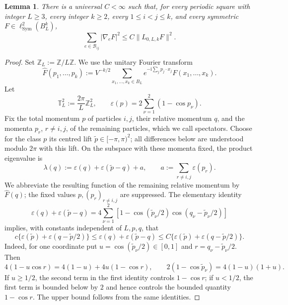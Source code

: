 \documentclass[11pt]{article}
\numberwithin{equation}{section}
\newtheorem{lemma}[theorem]{Lemma}
\theoremstyle{remark}
\newcommand{\1}{\mathbf 1}
\newcommand{\Sym}{\operatorname{Sym}}
\begin{document}
\begin{lemma}
\label{lem:single-diagonal-trace}
There is a universal \(C<\infty\) such that, for every periodic square with
integer \(L\geq3\), every integer \(k\geq2\), every
\(1\leq i<j\leq k\), and every symmetric
\(F\in\ell^2_{\Sym}(B_L^k)\),
\begin{equation}
 \sum_{e\in\mathcal B_{ij}}|\nabla_eF|^2
 \leq C\|L_{0,L,k}F\|^2.
 \label{eq:single-diagonal-trace}
\end{equation}
\end{lemma}

\begin{proof}
Set \(\mathbb Z_L:=\mathbb Z/L\mathbb Z\).  We use the unitary Fourier
transform
\[
 \widehat F(p_1,\ldots,p_k)
 :=V^{-k/2}\sum_{x_1,\ldots,x_k\in B_L}
 e^{-\mathrm i\sum_jp_j\cdot x_j}F(x_1,\ldots,x_k).
\]
Let
\[
 \mathbb T_L^2:=\frac{2\pi}{L}\mathbb Z_L^2,
 \qquad
 \varepsilon(p)=2\sum_{\nu=1}^2(1-\cos p_\nu).
\]
Fix the total momentum \(p\) of particles \(i,j\), their relative momentum
\(q\), and the momenta \(p_r\), \(r\ne i,j\), of the remaining particles,
which we call spectators.  Choose for the
class \(p\) its centred lift \(\widetilde p\in[-\pi,\pi)^2\); all
differences below are understood modulo \(2\pi\) with this lift.  On the
subspace with these momenta fixed, the product eigenvalue is
\begin{equation}
 \lambda(q):=\varepsilon(q)+\varepsilon(\widetilde p-q)+a,
 \qquad a:=\sum_{r\ne i,j}\varepsilon(p_r).
 \label{eq:product-fibre-energy}
\end{equation}
We abbreviate the resulting function of the remaining relative momentum
by \(\widehat F(q)\); the fixed values \(p,(p_r)_{r\ne i,j}\) are
suppressed.
The elementary identity
\[
 \varepsilon(q)+\varepsilon(\widetilde p-q)
 =4\sum_{\nu=1}^2
 \left[1-\cos(\widetilde p_\nu/2)
 \cos(q_\nu-\widetilde p_\nu/2)\right]
\]
implies, with constants independent of \(L,p,q\), that
\begin{equation}
 c\bigl\{\varepsilon(\widetilde p)
       +\varepsilon(q-\widetilde p/2)\bigr\}
 \leq \varepsilon(q)+\varepsilon(\widetilde p-q)
 \leq C\bigl\{\varepsilon(\widetilde p)
       +\varepsilon(q-\widetilde p/2)\bigr\}.
 \label{eq:pair-dispersion-comparison}
\end{equation}
Indeed, for one coordinate put
\(u=\cos(\widetilde p_\nu/2)\in[0,1]\) and
\(r=q_\nu-\widetilde p_\nu/2\).  Then
\[
 4(1-u\cos r)=4(1-u)+4u(1-\cos r),
 \qquad
 2(1-\cos\widetilde p_\nu)=4(1-u)(1+u).
\]
If \(u\geq1/2\), the second term in the first identity controls
\(1-\cos r\); if \(u<1/2\), the first term is bounded below by \(2\)
and hence controls the bounded quantity \(1-\cos r\).  The upper bound
follows from the same identities.


\end{proof}
\end{document}
